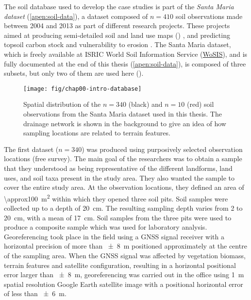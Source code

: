 The soil database used to develop the case studies is part of the \emph{Santa Maria dataset}
(\autoref{apen:soil-data}), a dataset composed of $n = 410$ soil observations made between \num{2004}
and \num{2013} as part of different research projects. These projects aimed at producing semi-detailed
soil and land use maps ()
\cite{Pedron2005,Miguel2010,SamuelRosaEtAl2011a,MiguelEtAl2012,Samuel-RosaEtAl2013}, and predicting topsoil
carbon stock and vulnerability to erosion \cite{Samuel-Rosa2009,MouraBueno2012,Miguel2013}. The Santa Maria 
dataset,
which is freely available at ISRIC World Soil Information Service 
(\href{http://www.isric.org/data/wosis}{WoSIS}), and is
fully documented at the end of this thesis (\autoref{apen:soil-data}), is composed of three subsets, but only 
two of them are
used here ().

\begin{figure}[!ht]
\centering
\texttt{[image: fig/chap00-intro-database]}
\caption{Spatial distribution of the $n = 340$ (black) and $n = 10$ (red) soil observations from
the Santa Maria dataset used in this thesis. The drainage network is shown in the background to
give an idea of how sampling locations are related to terrain features.}
\label{fig:intro-database}
\end{figure}

The first dataset ($n = 340$) was produced using purposively selected observation locations (free
survey). The main goal of the researchers was to obtain a sample that they understood as being
representative of the different landforms, land uses, and soil taxa present in the study area. They
also wanted the sample to cover the entire study area. At the observation locations, they defined
an area of \SI{\approx100}{\metre\squared} within which they opened three soil pits. Soil samples
were collected up to a depth of \SI{20}{\centi\metre}. The resulting sampling depth varies from
\num{2} to \SI{20}{\centi\metre}, with a mean of \SI{17}{\centi\metre}. Soil samples from the three
pits were used to produce a composite sample which was used for laboratory analysis. Georeferencing
took place in the field using a GNSS signal receiver with a horizontal precision of more than
\SI{\pm8}{\metre} positioned approximately at the centre of the sampling area. When the GNSS signal
was affected by vegetation biomass, terrain features and satellite configuration, resulting in a
horizontal positional error larger than \SI{\pm8}{\metre}, georeferencing was carried out in the
office using \SI{1}{\metre} spatial resolution Google Earth\textregistered{} satellite image with
a positional horizontal error of less than \SI{\pm6}{\metre}.

